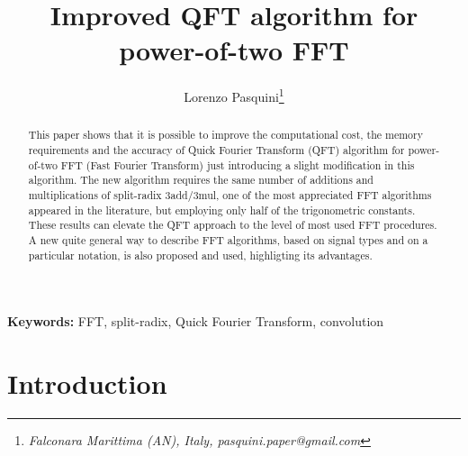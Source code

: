\documentclass[a4paper,10pt]{article}
\begin{document}
\title{Improved QFT algorithm for power-of-two FFT}



\author{Lorenzo Pasquini\footnote{\em Falconara Marittima (AN), Italy, pasquini.paper@gmail.com}} 
 






\maketitle



\begin{abstract} 
This paper shows that it is possible to improve the computational cost, the memory requirements and the accuracy of Quick Fourier Transform (QFT) algorithm for power-of-two FFT (Fast Fourier Transform) just introducing a slight modification in this algorithm.
The new algorithm requires the same number of additions and multiplications of split-radix 3add/3mul, one of the most appreciated FFT algorithms appeared in the literature, but employing only half of the trigonometric constants. 
These results can elevate the QFT approach to the level of most used FFT procedures. 
A new quite general way to describe FFT algorithms, based on signal types and on a particular notation, is also proposed and used, highligting its advantages.

\end{abstract} 






\smallskip
\noindent \textbf{Keywords:} FFT, split-radix, Quick Fourier Transform, convolution




\section{Introduction} \label{sec:introduction}
\end{document}
